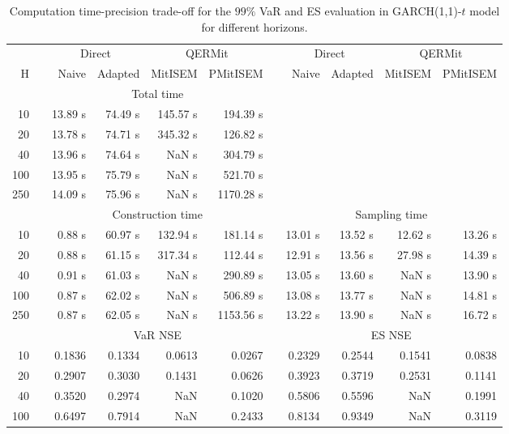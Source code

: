 { \renewcommand{\arraystretch}{1.3} 
\begin{table}[h] 
\centering 
\caption{Computation time-precision trade-off for the  $99\%$ VaR and ES evaluation in GARCH(1,1)-$t$ model for different horizons.} 
\label{tab:time_precision_t_garch2_noS} 
\begin{tabular}{rr rrrr r rrrr}  
 & & \multicolumn{2}{c}{Direct} & \multicolumn{2}{c}{QERMit}&  & \multicolumn{2}{c}{Direct} & \multicolumn{2}{c}{QERMit} \\ \cline{3-6} \cline{8-11} 
 H & & Naive & Adapted & MitISEM & PMitISEM & & Naive & Adapted & MitISEM & PMitISEM \\ \hline 
 & & \multicolumn{4}{c}{Total time}  \\ \cline{3-6} 
10 & & 13.89 s & 74.49 s & 145.57 s & 194.39 s \\ 
20 & & 13.78 s & 74.71 s & 345.32 s & 126.82 s \\ 
40 & & 13.96 s & 74.64 s &  NaN s & 304.79 s \\ 
100 & & 13.95 s & 75.79 s &  NaN s & 521.70 s \\ 
250 & & 14.09 s & 75.96 s &  NaN s & 1170.28 s \\ 
\hline 
 & & \multicolumn{4}{c}{Construction time} & & \multicolumn{4}{c}{ Sampling time} \\ \cline{3-6}  \cline{8-11}
10 & & 0.88 s & 60.97 s & 132.94 s & 181.14 s && 13.01 s & 13.52 s & 12.62 s & 13.26 s \\ 
20 & & 0.88 s & 61.15 s & 317.34 s & 112.44 s && 12.91 s & 13.56 s & 27.98 s & 14.39 s \\ 
40 & & 0.91 s & 61.03 s &  NaN s & 290.89 s && 13.05 s & 13.60 s &  NaN s & 13.90 s \\ 
100 & & 0.87 s & 62.02 s &  NaN s & 506.89 s && 13.08 s & 13.77 s &  NaN s & 14.81 s \\ 
250 & & 0.87 s & 62.05 s &  NaN s & 1153.56 s && 13.22 s & 13.90 s &  NaN s & 16.72 s \\ 
\hline 
 & & \multicolumn{4}{c}{VaR NSE} &&  \multicolumn{4}{c}{ES NSE} \\ \cline{3-6}  \cline{8-11}
10 && 0.1836  & 0.1334  & 0.0613 & 0.0267 && 0.2329  & 0.2544  & 0.1541 & 0.0838 \\ 
20 && 0.2907  & 0.3030  & 0.1431 & 0.0626 && 0.3923  & 0.3719  & 0.2531 & 0.1141 \\ 
40 && 0.3520  & 0.2974  &    NaN & 0.1020 && 0.5806  & 0.5596  &    NaN & 0.1991 \\ 
100 && 0.6497  & 0.7914  &    NaN & 0.2433 && 0.8134  & 0.9349  &    NaN & 0.3119 \\ 

\end{tabular}
\end{table}}
